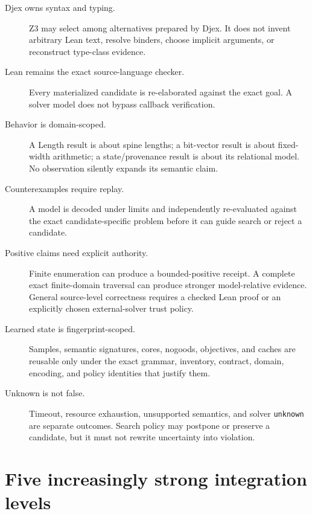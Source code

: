 \documentclass[10pt,letterpaper,oneside]{report}
\newcommand{\unknown}{\texttt{unknown}}
\begin{document}
\begin{description}
\item[Djex owns syntax and typing.] Z3 may select among alternatives prepared by Djex. It does not invent arbitrary Lean text, resolve binders, choose implicit arguments, or reconstruct type-class evidence.

\item[Lean remains the exact source-language checker.] Every materialized candidate is re-elaborated against the exact goal. A solver model does not bypass callback verification.

\item[Behavior is domain-scoped.] A Length result is about spine lengths; a bit-vector result is about fixed-width arithmetic; a state/provenance result is about its relational model. No observation silently expands its semantic claim.

\item[Counterexamples require replay.] A model is decoded under limits and independently re-evaluated against the exact candidate-specific problem before it can guide search or reject a candidate.

\item[Positive claims need explicit authority.] Finite enumeration can produce a bounded-positive receipt. A complete exact finite-domain traversal can produce stronger model-relative evidence. General source-level correctness requires a checked Lean proof or an explicitly chosen external-solver trust policy.

\item[Learned state is fingerprint-scoped.] Samples, semantic signatures, cores, nogoods, objectives, and caches are reusable only under the exact grammar, inventory, contract, domain, encoding, and policy identities that justify them.

\item[Unknown is not false.] Timeout, resource exhaustion, unsupported semantics, and solver \unknown{} are separate outcomes. Search policy may postpone or preserve a candidate, but it must not rewrite uncertainty into violation.
\end{description}

\section{Five increasingly strong integration levels}
\end{document}
